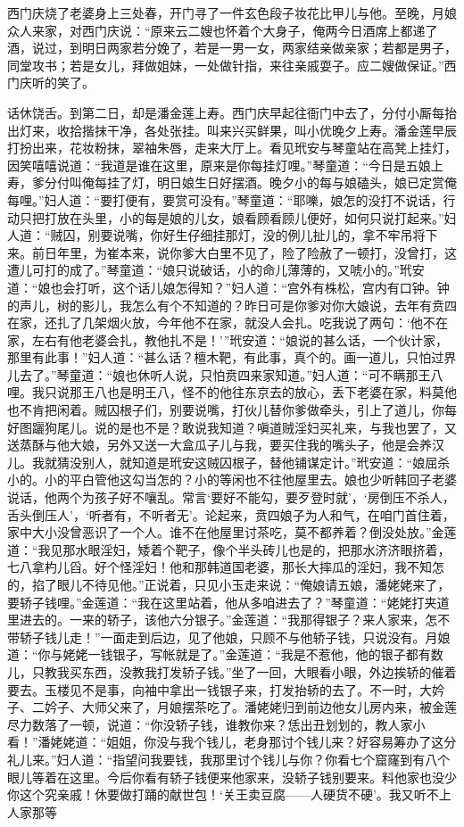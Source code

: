 西门庆烧了老婆身上三处春，开门寻了一件玄色段子妆花比甲儿与他。至晚，月娘众人来家，对西门庆说：“原来云二嫂也怀着个大身子，俺两今日酒席上都递了酒，说过，到明日两家若分娩了，若是一男一女，两家结亲做亲家；若都是男子，同堂攻书；若是女儿，拜做姐妹，一处做针指，来往亲戚耍子。应二嫂做保证。”西门庆听的笑了。

话休饶舌。到第二日，却是潘金莲上寿。西门庆早起往衙门中去了，分付小厮每抬出灯来，收拾揩抹干净，各处张挂。叫来兴买鲜果，叫小优晚夕上寿。潘金莲早辰打扮出来，花妆粉抹，翠袖朱唇，走来大厅上。看见玳安与琴童站在高凳上挂灯，因笑嘻嘻说道：“我道是谁在这里，原来是你每挂灯哩。”琴童道：“今日是五娘上寿，爹分付叫俺每挂了灯，明日娘生日好摆酒。晚夕小的每与娘磕头，娘已定赏俺每哩。”妇人道：“要打便有，要赏可没有。”琴童道：“耶嚛，娘怎的没打不说话，行动只把打放在头里，小的每是娘的儿女，娘看顾看顾儿便好，如何只说打起来。”妇人道：“贼囚，别要说嘴，你好生仔细挂那灯，没的例儿扯儿的，拿不牢吊将下来。前日年里，为崔本来，说你爹大白里不见了，险了险赦了一顿打，没曾打，这遭儿可打的成了。”琴童道：“娘只说破话，小的命儿薄薄的，又唬小的。”玳安道：“娘也会打听，这个话儿娘怎得知？”妇人道：“宫外有株松，宫内有口钟。钟的声儿，树的影儿，我怎么有个不知道的？昨日可是你爹对你大娘说，去年有贲四在家，还扎了几架烟火放，今年他不在家，就没人会扎。吃我说了两句：‘他不在家，左右有他老婆会扎，教他扎不是！’”玳安道：“娘说的甚么话，一个伙计家，那里有此事！”妇人道：“甚么话？檀木靶，有此事，真个的。画一道儿，只怕过界儿去了。”琴童道：“娘也休听人说，只怕贲四来家知道。”妇人道：“可不瞒那王八哩。我只说那王八也是明王八，怪不的他往东京去的放心，丢下老婆在家，料莫他也不肯把\textMaoBi 闲着。贼囚根子们，别要说嘴，打伙儿替你爹做牵头，引上了道儿，你每好图躧狗尾儿。说的是也不是？敢说我知道？嗔道贼淫妇买礼来，与我也罢了，又送蒸酥与他大娘，另外又送一大盒瓜子儿与我，要买住我的嘴头子，他是会养汉儿。我就猜没别人，就知道是玳安这贼囚根子，替他铺谋定计。”玳安道：“娘屈杀小的。小的平白管他这勾当怎的？小的等闲也不往他屋里去。娘也少听韩回子老婆说话，他两个为孩子好不嚷乱。常言‘要好不能勾，要歹登时就’，‘房倒压不杀人，舌头倒压人’，‘听者有，不听者无’。论起来，贲四娘子为人和气，在咱门首住着，家中大小没曾恶识了一个人。谁不在他屋里讨茶吃，莫不都养着？倒没处放。”金莲道：“我见那水眼淫妇，矮着个靶子，像个半头砖儿也是的，把那水济济眼挤着，七八拿杓儿舀。好个怪淫妇！他和那韩道国老婆，那长大摔瓜的淫妇，我不知怎的，掐了眼儿不待见他。”正说着，只见小玉走来说：“俺娘请五娘，潘姥姥来了，要轿子钱哩。”金莲道：“我在这里站着，他从多咱进去了？”琴童道：“姥姥打夹道里进去的。一来的轿子，该他六分银子。”金莲道：“我那得银子？来人家来，怎不带轿子钱儿走！”一面走到后边，见了他娘，只顾不与他轿子钱，只说没有。月娘道：“你与姥姥一钱银子，写帐就是了。”金莲道：“我是不惹他，他的银子都有数儿，只教我买东西，没教我打发轿子钱。”坐了一回，大眼看小眼，外边挨轿的催着要去。玉楼见不是事，向袖中拿出一钱银子来，打发抬轿的去了。不一时，大妗子、二妗子、大师父来了，月娘摆茶吃了。潘姥姥归到前边他女儿房内来，被金莲尽力数落了一顿，说道：“你没轿子钱，谁教你来？恁出丑划划的，教人家小看！”潘姥姥道：“姐姐，你没与我个钱儿，老身那讨个钱儿来？好容易筹办了这分礼儿来。”妇人道：“指望问我要钱，我那里讨个钱儿与你？你看七个窟窿到有八个眼儿等着在这里。今后你看有轿子钱便来他家来，没轿子钱别要来。料他家也没少你这个究亲戚！休要做打踊的献世包！‘关王卖豆腐——人硬货不硬’。我又听不上人家那等\textMaoBi 